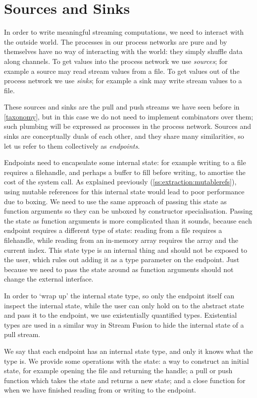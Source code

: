 \section{Sources and Sinks}
In order to write meaningful streaming computations, we need to interact with the outside world.
The processes in our process networks are pure and by themselves have no way of interacting with the world: they simply shuffle data along channels.
To get values into the process network we use \emph{sources}; for example a source may read stream values from a file.
To get values out of the process network we use \emph{sinks}; for example a sink may write stream values to a file.

These sources and sinks are the pull and push streams we have seen before in \cref{taxonomy}, but in this case we do not need to implement combinators over them; such plumbing will be expressed as processes in the process network.
Sources and sinks are conceptually duals of each other, and they share many similarities, so let us refer to them collectively as \emph{endpoints}.

Endpoints need to encapsulate some internal state: for example writing to a file requires a filehandle, and perhaps a buffer to fill before writing, to amortise the cost of the system call.
As explained previously (\cref{ss:extraction:mutablerefs}), using mutable references for this internal state would lead to poor performance due to boxing.
We need to use the same approach of passing this state as function arguments so they can be unboxed by constructor specialisation.
Passing the state as function arguments is more complicated than it sounds, because each endpoint requires a different type of state: reading from a file requires a filehandle, while reading from an in-memory array requires the array and the current index.
This state type is an internal thing and should not be exposed to the user, which rules out adding it as a type parameter on the endpoint.
Just because we need to pass the state around as function arguments should not change the external interface.

In order to `wrap up' the internal state type, so only the endpoint itself can inspect the internal state, while the user can only hold on to the abstract state and pass it to the endpoint, we use existentially quantified types.
Existential types are used in a similar way in Stream Fusion \cite{coutts2007stream} to hide the internal state of a pull stream.

We say that each endpoint has an internal state type, and only it knows what the type is.
We provide some operations with the state: a way to construct an initial state, for example opening the file and returning the handle; a pull or push function which takes the state and returns a new state; and a close function for when we have finished reading from or writing to the endpoint.

